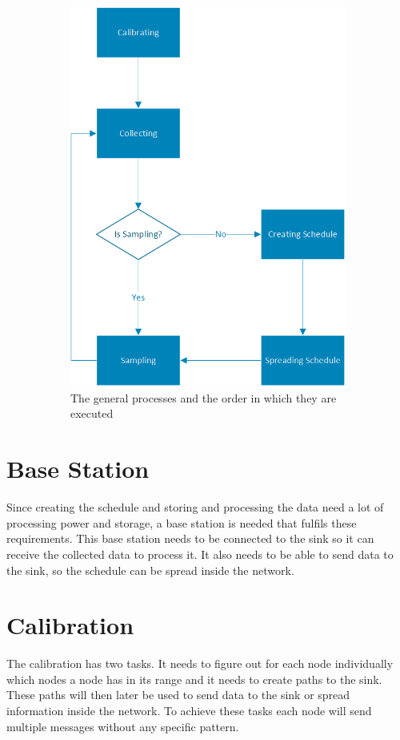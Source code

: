 \begin{figure}[htbp]
\begin{subfigure}[t]{0.4\textwidth}
        \includegraphics[scale=0.7]{content/images/GeneralAproachM}
        \caption{The general processes and the order in which they are executed}
        \label{fig:processes}
    \end{subfigure}
    \caption{}
\end{figure}

\section{Base Station}
Since creating the schedule and storing and processing the data need a lot of processing power and storage, a base station is needed that fulfils these requirements. This base station needs to be connected to the sink so it can receive the collected data to process it. It also needs to be able to send data to the sink, so the schedule can be spread inside the network.  
  
\section{Calibration}
The calibration has two tasks. It needs to figure out for each node individually which nodes a node has in its range and it needs to create paths to the sink. These paths will then later be used to send data to the sink or spread information inside the network. To achieve these tasks each node will send multiple messages without any specific pattern.   
